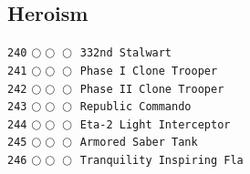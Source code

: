 \documentclass[a4paper,landscape]{article}
\begin{document}
\begin{multicols*}{5}
\section{Heroism} 
\vspace{-2mm} 
\texttt{240} \(\bigcirc\!\bigcirc\!\bigcirc\)  \texttt{332nd Stalwart} \vspace{-0.3mm}\\ 
\texttt{241} \(\bigcirc\!\bigcirc\!\bigcirc\)  \texttt{Phase I Clone Trooper} \vspace{-0.3mm}\\ 
\texttt{242} \(\bigcirc\!\bigcirc\!\bigcirc\)  \texttt{Phase II Clone Trooper} \vspace{-0.3mm}\\ 
\texttt{243} \(\bigcirc\!\bigcirc\!\bigcirc\)  \texttt{Republic Commando} \vspace{-0.3mm}\\ 
\texttt{244} \(\bigcirc\!\bigcirc\!\bigcirc\)  \texttt{Eta-2 Light Interceptor} \vspace{-0.3mm}\\ 
\texttt{245} \(\bigcirc\!\bigcirc\!\bigcirc\)  \texttt{Armored Saber Tank} \vspace{-0.3mm}\\ 
\texttt{246} \(\bigcirc\!\bigcirc\!\bigcirc\)  \texttt{Tranquility Inspiring Fla} \vspace{-0.3mm}\\ 

\end{multicols*}
\end{document}
